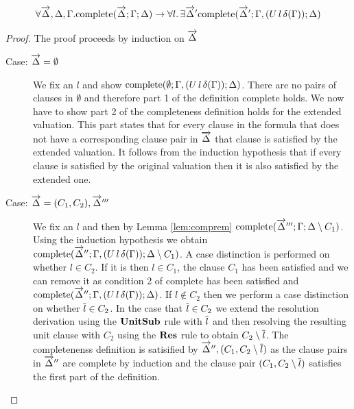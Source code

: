\begin{mylemma}\label{lem:compunit}
\begin{align*}\forall \overrightarrow{\Delta},\Delta,\Gamma.  \mathrm{complete}(\overrightarrow{\Delta};\Gamma; \Delta) \to \forall l. \, \exists \overrightarrow{\Delta}' \mathrm{complete}(\overrightarrow{\Delta}';\Gamma, (U \, l \, \delta(\Gamma)); \Delta)
\end{align*}
\begin{proof}
The proof proceeds by induction on $\overrightarrow{\Delta}$
\begin{description}
\item[Case: $\overrightarrow{\Delta} = \emptyset$] 
We fix an $l$ and show $\mathrm{complete}(\emptyset;\Gamma, (U \, l \, \delta(\Gamma)); \Delta)$.  There are no pairs of clauses in $\emptyset$ and therefore part 1 of the definition $\mathrm{complete}$ holds. We now have to show part 2 of the completeness definition holds for the extended valuation. This part states that for every clause in the formula that does not have a corresponding clause pair in $\overrightarrow{\Delta}$ that clause is satisfied by the extended valuation.  It follows from the induction hypothesis that if every clause is satisfied by the original valuation then it is also satisfied by the extended one.
\item[Case: $\overrightarrow{\Delta} = (C_1, C_2), \overrightarrow{\Delta}'''$] We fix an $l$ and then by Lemma \ref{lem:comprem} $\mathrm{complete}(\overrightarrow{\Delta}''';\Gamma; \Delta \setminus C_1)$. Using the induction hypothesis we obtain $\mathrm{complete}(\overrightarrow{\Delta}'';\Gamma, (U \, l \, \delta(\Gamma)); \Delta \setminus C_1)$. A case distinction is performed on whether $l \in C_2$. If it is then $l \in C_1$, the clause $C_1$ has been satisfied and we can remove it as condition 2 of $\mathrm{complete}$ has been satisfied and $\mathrm{complete}(\overrightarrow{\Delta}'';\Gamma, (U \, l \, \delta(\Gamma)); \Delta)$. If $l \notin C_2$ then we perform a case distinction on whether $\overline{l} \in C_2$. In the case that $\overline{l} \in C_2$ we extend the resolution derivation using the $\mathbf{UnitSub}$ rule with $\overline{l}$ and then resolving the resulting unit clause with $C_2$ using the $\mathbf{Res}$ rule to obtain $C_2 \setminus \overline{l}$. The completenenss definition is satisified by $\overrightarrow{\Delta}'',(C_1, C_2 \setminus \overline{l})$ as the clause pairs in $\overrightarrow{\Delta}''$ are complete by induction and the clause pair $(C_1, C_2 \setminus \overline{l})$ satisfies the first part of the definition. 
\end{description}
\end{proof}
\end{mylemma}

